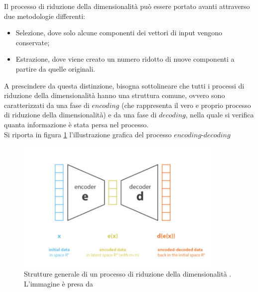 \newpage

Il processo di riduzione della dimensionalità può essere portato avanti attraverso due metodologie differenti:
\begin{itemize}
	\item Selezione, dove solo alcune componenti dei vettori di input vengono conservate;
	\item Estrazione, dove viene creato un numero ridotto di nuove componenti a partire da quelle originali.
\end{itemize}
A prescindere da questa distinzione, bisogna sottolineare che tutti i processi di riduzione della dimensionalità hanno una struttura comune, ovvero sono caratterizzati da una fase di $\textit{encoding}$ (che rappresenta il vero e proprio processo di riduzione della dimensionalità) e da una fase di $\textit{decoding}$, nella quale si verifica quanta informazione è stata persa nel processo. \\ 
Si riporta in figura \ref{encoder-decoder} l'illustrazione grafica del processo $\textit{encoding-decoding}$
\begin{figure}[h!]
	\centering
	\includegraphics[width=0.90\textwidth]{figs/encoder-decoder.png}
	\caption{Strutture generale di un processo di riduzione della dimensionalità . L'immagine è presa da \cite{Understanding_VAEs}}
	\label{encoder-decoder}
\end{figure}


